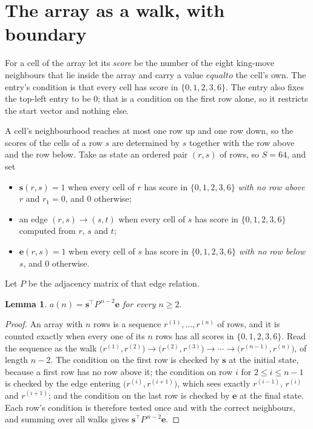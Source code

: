 \documentclass[11pt,a4paper]{article}
\theoremstyle{plain}
\newtheorem{lemma}[theorem]{Lemma}
\theoremstyle{definition}
\begin{document}
\section{The array as a walk, with boundary}

For a cell of the array let its \emph{score} be the number of the eight king-move neighbours that lie inside
the array and carry a value $equal to$ the cell's own. The entry's condition is that every cell
has score in $\{0,1,2,3,6\}$. The entry also fixes the top-left entry to be $0$; that is a condition on the first row alone, so it restricts the start vector and nothing else.

A cell's neighbourhood reaches at most one row up and one row down, so the scores of the
cells of a row $s$ are determined by $s$ together with the row above and the row below.
Take as state an ordered pair $(r,s)$ of rows, so $S=64$, and set
\begin{itemize}
\item $\mathbf{s}(r,s)=1$ when every cell of $r$ has score in $\{0,1,2,3,6\}$ \emph{with no row
above $r$} and $r_1=0$, and $0$ otherwise;
\item an edge $(r,s)\to(s,t)$ when every cell of $s$ has score in $\{0,1,2,3,6\}$ computed from
$r$, $s$ and $t$;
\item $\mathbf{e}(r,s)=1$ when every cell of $s$ has score in $\{0,1,2,3,6\}$ \emph{with no row
below $s$}, and $0$ otherwise.
\end{itemize}
Let $P$ be the adjacency matrix of that edge relation.

\begin{lemma}\label{lem:walk}
$a(n)=\mathbf{s}^{\!\top}P^{\,n-2}\mathbf{e}$ for every $n\ge2$.
\end{lemma}

\begin{proof}
An array with $n$ rows is a sequence $r^{(1)},\dots,r^{(n)}$ of rows, and it is counted
exactly when every one of its $n$ rows has all scores in $\{0,1,2,3,6\}$. Read the sequence as the
walk $\bigl(r^{(1)},r^{(2)}\bigr)\to\bigl(r^{(2)},r^{(3)}\bigr)\to\cdots\to
\bigl(r^{(n-1)},r^{(n)}\bigr)$, of length $n-2$. The condition on the first row is
checked by $\mathbf{s}$ at the initial state, because a first row has no row above it; the
condition on row $i$ for $2\le i\le n-1$ is checked by the edge entering
$\bigl(r^{(i)},r^{(i+1)}\bigr)$, which sees exactly $r^{(i-1)}$, $r^{(i)}$ and
$r^{(i+1)}$; and the condition on the last row is checked by $\mathbf{e}$ at the final
state. Each row's condition is therefore tested once and with the correct neighbours, and
summing over all walks gives $\mathbf{s}^{\!\top}P^{\,n-2}\mathbf{e}$.
\end{proof}
\end{document}
